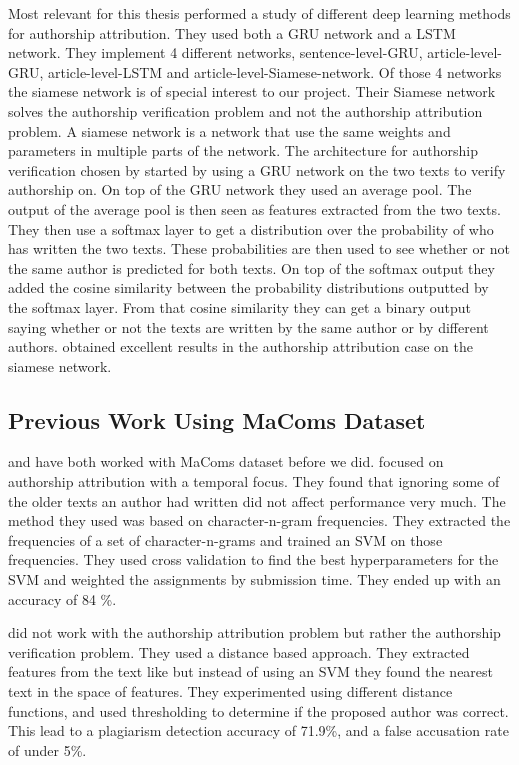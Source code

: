 Most relevant for this thesis \citet{qian:2018} performed a study of different
deep learning methods for authorship attribution. They used both a \gls{GRU}
network and a \gls{LSTM} network. They implement 4 different networks,
sentence-level-\gls{GRU}, article-level-\gls{GRU}, article-level-\gls{LSTM} and
article-level-Siamese-network. Of those 4 networks the siamese network is of
special interest to our project. Their Siamese network solves the authorship
verification problem and not the authorship attribution problem. A siamese
network is a network that use the same weights and parameters in multiple
parts of the network. The architecture for authorship verification chosen by
\citet{qian:2018} started by using a \gls{GRU} network on the two texts to
verify authorship on. On top of the \gls{GRU} network they used an average
pool. The output of the average pool is then seen as features extracted from
the two texts. They then use a softmax layer to get a distribution over the
probability of who has written the two texts. These probabilities are then used
to see whether or not the same author is predicted for both texts. On top of
the softmax output they added the cosine similarity between the probability
distributions outputted by the softmax layer. From that cosine similarity they
can get a binary output saying whether or not the texts are written by the same
author or by different authors. \citet{qian:2018} obtained excellent results in
the authorship attribution case on the siamese network.


\subsection{Previous Work Using MaComs Dataset}
\label{subsec:previous_work_using_macoms_dataset}

\citet{hansen2014} and \citet{aalykke2016} have both worked with MaComs dataset
before we did. \citet{hansen2014} focused on authorship attribution with a
temporal focus. They found that ignoring some of the older texts an author had
written did not affect performance very much. The method they used was based
on character-n-gram frequencies. They extracted the frequencies of a set of
character-n-grams and trained an \gls{SVM} on those frequencies. They used cross
validation to find the best hyperparameters for the \gls{SVM} and weighted the
assignments by submission time. They ended up with an accuracy of 84 \%.

\citet{aalykke2016} did not work with the authorship attribution problem but
rather the authorship verification problem. They used a distance based approach.
They extracted features from the text like \citet{hansen2014} but instead of
using an \gls{SVM} they found the nearest text in the space of features. They
experimented using different distance functions, and used thresholding
to determine if the proposed author was correct.
This lead to a plagiarism detection accuracy of 71.9\%, and a false accusation
rate of under 5\%.

